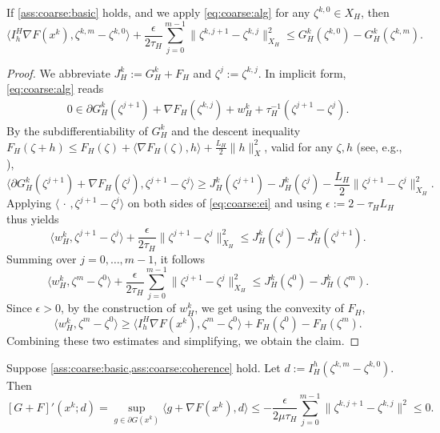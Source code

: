 \documentclass[a4paper,english]{jnsao}
\theoremstyle{definition}
\numberwithin{algorithm}{section}
\newcommand{\df}[2]{#1 ( #2 )}
\newcommand{\nr}[2]{ \| #1 \|_{#2}}
\newcommand{\pd}[2]{ \langle #1,#2 \rangle}
\def\grad{\nabla}
\def\defeq{:=}
\begin{document}
\begin{lemma}
    \label{lemma:coarse:descent}
    If \cref{ass:coarse:basic} holds, and we apply \eqref{eq:coarse:alg} for any $\zeta ^{k,0} \in X_H$, then
    \[
        \pd{I_h^H \nabla F(x^k)}{\zeta^{k,m}-\zeta^{k,0}}+\frac{\epsilon}{2\tau_H}\sum _{j=0}^{m-1}\nr{\zeta^{k,j+1}-\zeta^{k,j}}{X_H}^{2}\leq \df{G_{H}^{k}}{\zeta^{k,0}} - \df{G_{H}^{k}}{\zeta^{k,m}}.
    \]
\end{lemma}

\begin{proof}
    We abbreviate $J_H^k \defeq G_H^k + F_H$ and $\zeta^j \defeq \zeta^{k,j}$.
    In implicit form, \eqref{eq:coarse:alg} reads
    \begin{align}
        \label{eq:coarse:ei}
        0\in \df{\partial G_{H}^k}{\zeta^{j+1}} + \df{\nabla F_{H}}{\zeta ^{k,j}}+w_{H}^{k}+ \tau_H^{-1}\df{}{\zeta^{j+1}-\zeta^{j}}.
    \end{align}
    By the subdifferentiability of $G_H^k$ and the descent inequality
    $F_H(\zeta+h) \leq F_H(\zeta) + \pd{\grad F_H(\zeta)}{h} + \frac{L_H}{2}\nr{h}{X}^2$, valid for any $\zeta,h$ (see, e.g., \cite[Theorem 7.1]{clason2020introduction}),
    \[
        \pd{\df{\partial G_{H}^k}{\zeta^{j+1}}+\df{\nabla F_{H}}{\zeta^{j}}}{\zeta^{j+1}-\zeta^{j}}
        \ge
        \df{J_{H}^k}{\zeta^{j+1}}-\df{J_{H}^k}{\zeta^{j}}
        - \frac{L_H}{2}\nr{\zeta^{j+1}-\zeta^{j}}{X_H}^{2}.
    \]
    Applying \(\pd{\,\cdot\,}{\zeta^{j+1}-\zeta^{j}}\) on both sides of \cref{eq:coarse:ei} and using $\epsilon \defeq 2- \tau_HL_H$ thus yields
    \[
        \pd{w_H^k}{\zeta^{j+1}-\zeta^{j}}
        + \frac{\epsilon}{2\tau_H}\nr{\zeta^{j+1}-\zeta^{j}}{X_H}^{2}
        \le
        \df{J_{H}^k}{\zeta^{j}}-\df{J_{H}^k}{\zeta^{j+1}}.
    \]
    Summing  over $j=0,\ldots,m-1$, it follows
    \[
        \pd{w_{H}^{k}}{\zeta^{m}-\zeta^{0}}+\frac{\epsilon}{2\tau_H}\sum _{j=0}^{m-1}\nr{\zeta^{j+1}-\zeta^{j}}{X_H}^{2}
        \le
        \df{J_{H}^{k}}{\zeta^{0}} - \df{J_{H}^{k}}{\zeta^{m}}.
    \]
    Since $\epsilon>0$, by the construction of $w_{H}^{k}$, we get
    using the convexity of $F_H$,
    \[
        \pd{w_{H}^{k}}{\zeta^{m}-\zeta^{0}} \geq \pd{I_{h}^{H} \nabla F(x^k)}{\zeta^{m}-\zeta^{0}}+\df{F_{H}}{\zeta^{0}}-\df{F_{H}}{\zeta^{m}}.
    \]
    Combining these two estimates and simplifying, we obtain the claim.
\end{proof}

\begin{corollary}
    \label{cor:fb:cord}
    Suppose \cref{ass:coarse:basic,ass:coarse:coherence} hold.
    Let $d \defeq I_H^h(\zeta ^{k,m}-\zeta^{k,0})$.
    Then
    \[
        [G+F]'(x^k;d)
        =
        \sup _{g\in \df{\partial G}{x^{k}}}\pd{g+\df{\nabla F}{x^{k}}}{d}
        \leq
        -\frac{\epsilon}{2\mu\tau_H }\sum _{j=0}^{m-1}\nr{\zeta^{k,j+1}-\zeta^{k,j}}{}^{2} \le 0.
    \]
\end{corollary}
\end{document}
